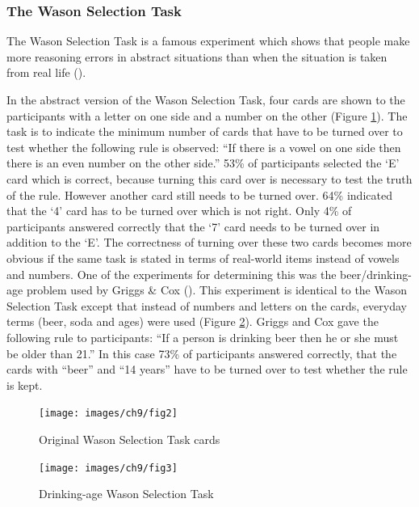 \documentclass[
]{krantz}
\begin{document}
\subsubsection*{The Wason Selection Task}\label{the-wason-selection-task}


The Wason Selection Task is a famous experiment which shows that people make more reasoning errors in abstract situations than when the situation is taken from real life ().

In the abstract version of the Wason Selection Task, four cards are shown to the participants with a letter on one side and a number on the other (Figure \ref{fig:wason1}). The task is to indicate the minimum number of cards that have to be turned over to test whether the following rule is observed: ``If there is a vowel on one side then there is an even number on the other side.'' 53\% of participants selected the `E' card which is correct, because turning this card over is necessary to test the truth of the rule. However another card still needs to be turned over. 64\% indicated that the `4' card has to be turned over which is not right. Only 4\% of participants answered correctly that the `7' card needs to be turned over in addition to the `E'. The correctness of turning over these two cards becomes more obvious if the same task is stated in terms of real-world items instead of vowels and numbers. One of the experiments for determining this was the beer/drinking-age problem used by Griggs \& Cox (). This experiment is identical to the Wason Selection Task except that instead of numbers and letters on the cards, everyday terms (beer, soda and ages) were used (Figure \ref{fig:wason2}). Griggs and Cox gave the following rule to participants: ``If a person is drinking beer then he or she must be older than 21.'' In this case 73\% of participants answered correctly, that the cards with ``beer'' and ``14 years'' have to be turned over to test whether the rule is kept.

\begin{figure}

{\centering \texttt{[image: images/ch9/fig2]} 

}

\caption{Original Wason Selection Task cards}\label{fig:wason1}
\end{figure}

\begin{figure}

{\centering \texttt{[image: images/ch9/fig3]} 

}

\caption{Drinking-age Wason Selection Task}\label{fig:wason2}
\end{figure}
\end{document}
